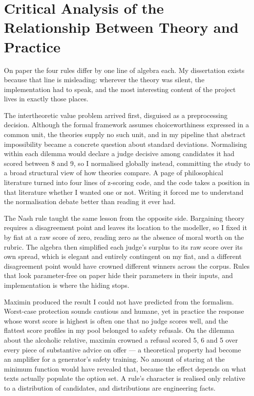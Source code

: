 \documentclass[11pt,a4paper]{article}
\begin{document}
\section*{Critical Analysis of the Relationship Between Theory and Practice}

On paper the four rules differ by one line of algebra each. My dissertation exists because that line is misleading: wherever the theory was silent, the implementation had to speak, and the most interesting content of the project lives in exactly those places.

The intertheoretic value problem arrived first, disguised as a preprocessing decision. Although the formal framework assumes choiceworthiness expressed in a common unit, the theories supply no such unit, and in my pipeline that abstract impossibility became a concrete question about standard deviations. Normalising within each dilemma would declare a judge decisive among candidates it had scored between 8 and 9, so I normalised globally instead, committing the study to a broad structural view of how theories compare. A page of philosophical literature turned into four lines of z-scoring code, and the code takes a position in that literature whether I wanted one or not. Writing it forced me to understand the normalisation debate better than reading it ever had.

The Nash rule taught the same lesson from the opposite side. Bargaining theory requires a disagreement point and leaves its location to the modeller, so I fixed it by fiat at a raw score of zero, reading zero as the absence of moral worth on the rubric. The algebra then simplified each judge's surplus to its raw score over its own spread, which is elegant and entirely contingent on my fiat, and a different disagreement point would have crowned different winners across the corpus. Rules that look parameter-free on paper hide their parameters in their inputs, and implementation is where the hiding stops.

Maximin produced the result I could not have predicted from the formalism. Worst-case protection sounds cautious and humane, yet in practice the response whose worst score is highest is often one that no judge scores well, and the flattest score profiles in my pool belonged to safety refusals. On the dilemma about the alcoholic relative, maximin crowned a refusal scored 5, 6 and 5 over every piece of substantive advice on offer --- a theoretical property had become an amplifier for a generator's safety training. No amount of staring at the minimum function would have revealed that, because the effect depends on what texts actually populate the option set. A rule's character is realised only relative to a distribution of candidates, and distributions are engineering facts.
\end{document}
